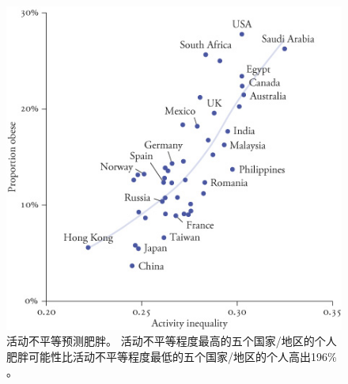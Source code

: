 \begin{figure}[!htb]
	\centering
	\includegraphics[width=0.75\linewidth]{chap13/13_2}
	\caption{活动不平等预测肥胖。
		活动不平等程度最高的五个国家/地区的个人肥胖可能性比活动不平等程度最低的五个国家/地区的个人高出196\% \cite{althoff2017large}。 \label{fig:13_2}}
\end{figure}








